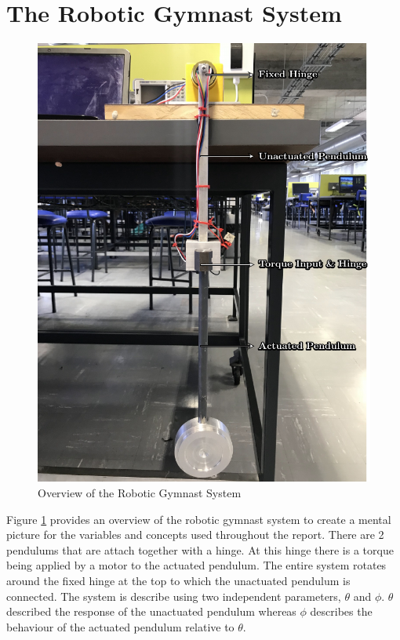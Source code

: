 \section{The Robotic Gymnast System}
\begin{figure}[h]
	\centering
	\includegraphics{./figs/overview/overview.pdf}
	\caption{Overview of the Robotic Gymnast System}
	\label{fig:overview}
\end{figure}

Figure \ref{fig:overview} provides an overview of the robotic gymnast system to create a mental picture for the variables and concepts used throughout the report. There are 2 pendulums that are attach together with a hinge. At this hinge there is a torque being applied by a motor to the actuated pendulum. The entire system rotates around the fixed hinge at the top to which the unactuated pendulum is connected. The system is describe using two independent parameters, $\theta$ and $\phi$. $\theta$ described the response of the unactuated pendulum whereas $\phi$ describes the behaviour of the actuated pendulum relative to $\theta$.\\

